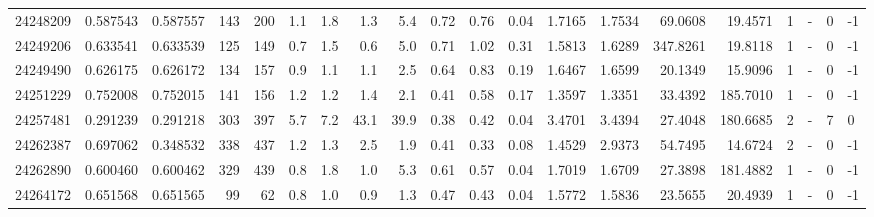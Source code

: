 \begin{tabular}{rrrrrrrrrrrrrrrrrlrl}
  24248209 & 0.587543 &   0.587557 &  143 &  200 &      1.1 &      1.8 &     1.3 &      5.4 &       0.72 &        0.76 &        0.04 &  1.7165 &  1.7534 &   69.0608 &   19.4571 &       1 &             - &        0 &        -1 \\
  24249206 & 0.633541 &   0.633539 &  125 &  149 &      0.7 &      1.5 &     0.6 &      5.0 &       0.71 &        1.02 &        0.31 &  1.5813 &  1.6289 &  347.8261 &   19.8118 &       1 &             - &        0 &        -1 \\
  24249490 & 0.626175 &   0.626172 &  134 &  157 &      0.9 &      1.1 &     1.1 &      2.5 &       0.64 &        0.83 &        0.19 &  1.6467 &  1.6599 &   20.1349 &   15.9096 &       1 &             - &        0 &        -1 \\
  24251229 & 0.752008 &   0.752015 &  141 &  156 &      1.2 &      1.2 &     1.4 &      2.1 &       0.41 &        0.58 &        0.17 &  1.3597 &  1.3351 &   33.4392 &  185.7010 &       1 &             - &        0 &        -1 \\
  24257481 & 0.291239 &   0.291218 &  303 &  397 &      5.7 &      7.2 &    43.1 &     39.9 &       0.38 &        0.42 &        0.04 &  3.4701 &  3.4394 &   27.4048 &  180.6685 &       2 &             - &        7 &         0 \\
  24262387 & 0.697062 &   0.348532 &  338 &  437 &      1.2 &      1.3 &     2.5 &      1.9 &       0.41 &        0.33 &        0.08 &  1.4529 &  2.9373 &   54.7495 &   14.6724 &       2 &             - &        0 &        -1 \\
  24262890 & 0.600460 &   0.600462 &  329 &  439 &      0.8 &      1.8 &     1.0 &      5.3 &       0.61 &        0.57 &        0.04 &  1.7019 &  1.6709 &   27.3898 &  181.4882 &       1 &             - &        0 &        -1 \\
  24264172 & 0.651568 &   0.651565 &   99 &   62 &      0.8 &      1.0 &     0.9 &      1.3 &       0.47 &        0.43 &        0.04 &  1.5772 &  1.5836 &   23.5655 &   20.4939 &       1 &             - &        0 &        -1 \\
\bottomrule
\end{tabular}

